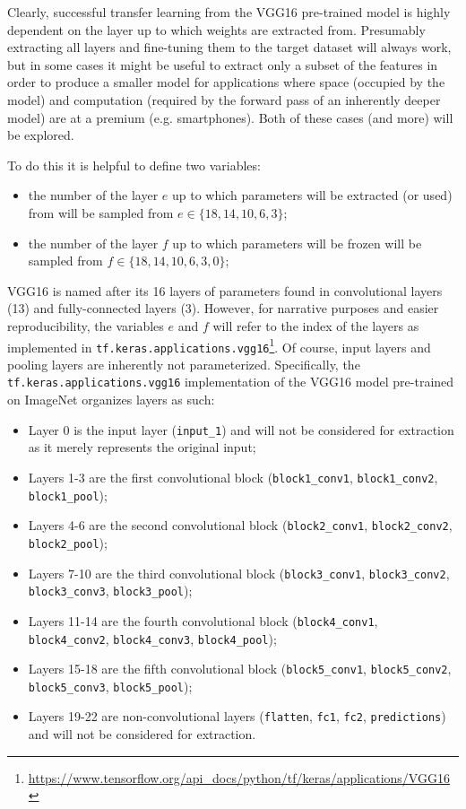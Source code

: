Clearly, successful transfer learning from the VGG16 pre-trained model is highly dependent on the layer up to which weights are extracted from. Presumably extracting all layers and fine-tuning them to the target dataset will always work, but in some cases it might be useful to extract only a subset of the features in order to produce a smaller model for applications where space (occupied by the model) and computation (required by the forward pass of an inherently deeper model) are at a premium (e.g. smartphones). Both of these cases (and more) will be explored.

To do this it is helpful to define two variables:

\begin{itemize}
    \item the number of the layer $e$ up to which parameters will be extracted (or used) from will be sampled from $e \in \{18,14,10,6,3\}$;
    \item the number of the layer $f$ up to which parameters will be frozen will be sampled from $f \in \{18,14,10,6,3,0\}$;
\end{itemize}

VGG16 is named after its 16 layers of parameters found in convolutional layers (13) and fully-connected layers (3). However, for narrative purposes and easier reproducibility, the variables $e$ and $f$ will refer to the index of the layers as implemented in \verb|tf.keras.applications.vgg16|\footnote{\url{https://www.tensorflow.org/api_docs/python/tf/keras/applications/VGG16}}. Of course, input layers and pooling layers are inherently not parameterized. Specifically, the \verb|tf.keras.applications.vgg16| implementation of the VGG16 model pre-trained on ImageNet organizes layers as such:

\begin{itemize}
    \item Layer 0 is the input layer (\verb|input_1|) and will not be considered for extraction as it merely represents the original input;
    \item Layers 1-3 are the first convolutional block (\verb|block1_conv1|, \verb|block1_conv2|, \verb|block1_pool|);
    \item Layers 4-6 are the second convolutional block (\verb|block2_conv1|, \verb|block2_conv2|, \verb|block2_pool|);
    \item Layers 7-10 are the third convolutional block (\verb|block3_conv1|, \verb|block3_conv2|, \verb|block3_conv3|, \verb|block3_pool|);
    \item Layers 11-14 are the fourth convolutional block (\verb|block4_conv1|, \verb|block4_conv2|, \verb|block4_conv3|, \verb|block4_pool|);
    \item Layers 15-18 are the fifth convolutional block (\verb|block5_conv1|, \verb|block5_conv2|, \verb|block5_conv3|, \verb|block5_pool|);
    \item Layers 19-22 are non-convolutional layers (\verb|flatten|, \verb|fc1|, \verb|fc2|, \verb|predictions|) and will not be considered for extraction.
\end{itemize}

